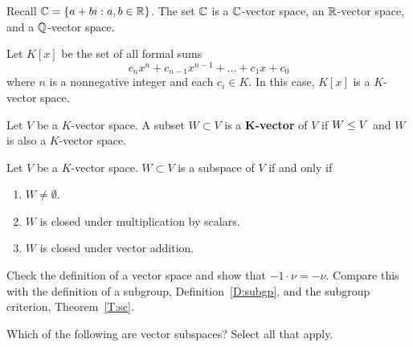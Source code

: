 \documentclass{ximera}
\begin{document}
\begin{example}
  Recall $\mathbb C = \{a+bi:a,b\in\mathbb R\}$. The set $\mathbb C$ is a $\mathbb C$-vector
  space, an $\mathbb R$-vector space, and a $\mathbb Q$-vector space.
\end{example}


\begin{example}[Polynomials]
  Let $K[x]$ be the set of all formal sums
  \[
  c_nx^n + c_{n-1}x^{n-1} + \dots + c_1 x + c_0
  \]
  where $n$ is a nonnegative integer and each $c_i \in K$. In this
  case, $K[x]$ is a $K$-vector space.
\end{example}




\begin{definition}
  Let $V$ be a $K$-vector space. A subset $W\subset V$ is a
  \textbf{$\boldsymbol K$-vector}  of $V$ if $W\leq V$ and $W$
  is also a $K$-vector space.
\end{definition}

\begin{lemma}
  Let $V$ be a $K$-vector space. $W\subset V$ is a subspace of $V$ if
  and only if
  \begin{enumerate}
  \item $W\ne \emptyset$.
  \item $W$ is closed under multiplication by scalars.
  \item $W$ is closed under vector addition.
  \end{enumerate}
  \begin{sketch}
    Check the definition of a vector space and show that $-1\cdot \nu=
    -\nu$. Compare this with the definition of a subgroup,
    Definition~\ref{D:subgp}, and the subgroup criterion, Theorem~\ref{T:sc}.
  \end{sketch}
\end{lemma}

\begin{exercise}
  Which of the following are vector subspaces? Select all that apply.
  \begin{selectAll}
  \end{selectAll}
\end{exercise}
\end{document}
